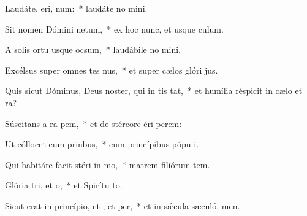 \item Laudáte, eri, num:~* laudáte no mini.
\item Sit nomen Dómini netum,~* ex hoc nunc, et usque  culum.
\item A solis ortu usque  ocsum,~* laudábile no mini.
\item Excélsus super omnes tes nus,~* et super cælos glóri jus.
\item Quis sicut Dóminus, Deus noster, qui in tis tat,~* et humília réspicit in cælo et  ra?
\item Súscitans a ra pem,~* et de stércore éri perem:
\item Ut cóllocet eum  prinbus,~* cum princípibus pópu i.
\item Qui habitáre facit stéri in mo,~* matrem filiórum tem.
\item Glória tri, et o,~* et Spirítu to.
\item Sicut erat in princípio, et , et per,~* et in sǽcula sæculó. men.
